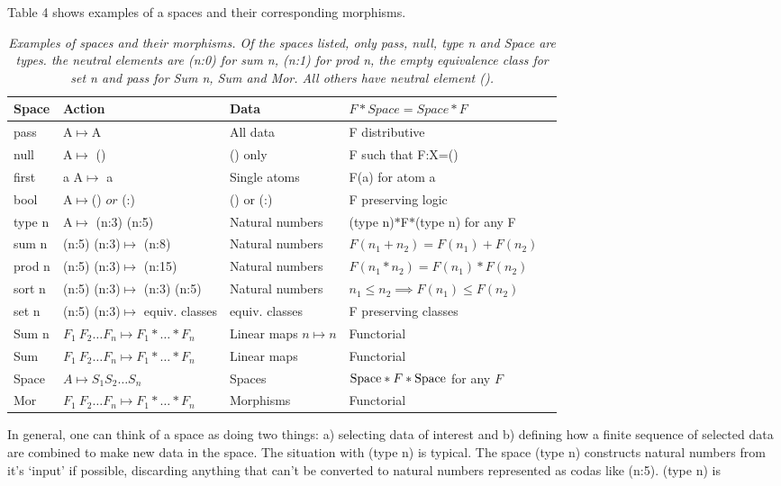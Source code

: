 \documentclass[11pt]{article}
\begin{document}
Table 4 shows examples of a spaces and their corresponding morphisms.
\begin{table}
\begin{tabular}{| l | l | l | l | l |  }
Space & Action & Data &  $F*Space=Space*F$ \\
\hline
pass & A$\mapsto$A & All data & F distributive \\
null & A$\mapsto$ () & () only & F such that F:X=() \\
first & a A$\mapsto$ a & Single atoms &  F(a) for atom a \\
bool & A$\mapsto$() $or$ (:) & () or (:) &  F preserving logic \\
type n & A$\mapsto$ (n:3) (n:5) & Natural numbers &  (type n)$*$F$*$(type n) for any F \\
sum n & (n:5) (n:3)$\mapsto$ (n:8) & Natural numbers &  $F(n_1+n_2)=F(n_1)+F(n_2)$ \\
prod n & (n:5) (n:3)$\mapsto$ (n:15) & Natural numbers &  $F(n_1*n_2)=F(n_1)*F(n_2)$ \\
sort n & (n:5) (n:3)$\mapsto$ (n:3) (n:5) & Natural numbers & $n_1\le n_2 \implies F(n_1)\le F(n_2)$ \\
set n & (n:5) (n:3)$\mapsto$ equiv. classes & equiv. classes & F preserving classes \\
Sum n & $F_1\ F_2\dots F_n\mapsto F_1*\dots *F_n$ & Linear maps $n\mapsto n$ & Functorial \\
Sum & $F_1\ F_2\dots F_n\mapsto F_1*\dots *F_n$ & Linear maps  & Functorial \\
Space & $A\mapsto S_1 S_2\dots S_n$ & Spaces & ${\rm Space}*F*{\rm Space}$ for any $F$\\
Mor & $F_1\ F_2\dots F_n\mapsto F_1*\dots *F_n$ & Morphisms & Functorial \\
\hline
\end{tabular}
\caption{{\it Examples of spaces and their morphisms.  Of the spaces listed, only pass, null, type n and Space are types.
the neutral elements are (n:0) for sum n, (n:1) for prod n, the empty equivalence class for set n and pass for Sum n, Sum and Mor.  All others have neutral element ().}}
\end{table}
In general, one can think of a space as doing two things:  a) selecting data of interest and b) defining how
a finite sequence of selected data are combined to make new data in the space.
The situation with (type n) is typical.  The space (type n) constructs natural numbers from it's `input' if possible,
discarding anything that can't be converted to natural numbers represented as codas like (n:5).  (type n) is
\end{document}
